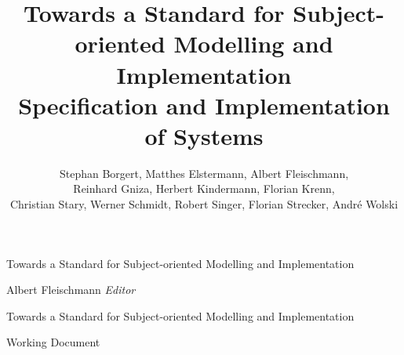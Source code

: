 \documentclass[11pt, showtrims, final, oldfontcommands]{memoir}
\title{Towards a Standard for Subject-oriented Modelling and Implementation\\ Specification and Implementation of Systems}
\author{Stephan Borgert, Matthes Elstermann, Albert Fleischmann, \\ Reinhard Gniza, Herbert Kindermann, Florian Krenn,\\ Christian Stary, Werner Schmidt, Robert Singer, Florian Strecker, Andr\'e Wolski}
\begin{document}

\frontmatter

\pagestyle{empty}

\vspace*{3cm}
\begin{adjustwidth}{0cm}{-3cm}
	\begin{flushright}
		\LARGE\textsf {Towards a Standard for Subject-oriented Modelling and Implementation}
	\end{flushright}
\end{adjustwidth}
\vspace*{\fill}
\cleardoublepage

\vspace*{0cm}
\begin{flushleft}
	\Large\textsf{Albert Fleischmann \textit{Editor}}\par
\end{flushleft}
\vspace{2cm}
\begin{flushleft}
	\Huge\textsf{Towards a Standard for Subject-oriented Modelling and Implementation}\par
	\bigskip\bigskip
	\Large\textsf{Working Document}
\end{flushleft}
\vspace{2.5cm}
\begin{flushleft}
\end{flushleft}
\vspace*{\fill}
\clearpage
\end{document}
